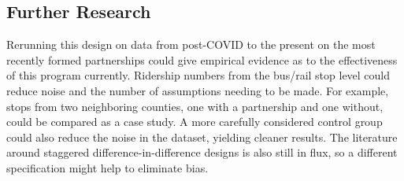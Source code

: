 \documentclass [12pt]{report}
\begin{document}
\subsection*{Further Research}
Rerunning this design on data from post-COVID to the present on the most recently formed partnerships could give empirical evidence as to the effectiveness of this program currently. Ridership numbers from the bus/rail stop level could reduce noise and the number of assumptions needing to be made. For example, stops from two neighboring counties, one with a partnership and one without, could be compared as a case study. A more carefully considered control group could also reduce the noise in the dataset, yielding cleaner results. The literature around staggered difference-in-difference designs is also still in flux, so a different specification might help to eliminate bias.

\newpage
{}
\printbibliography
\end{document}
